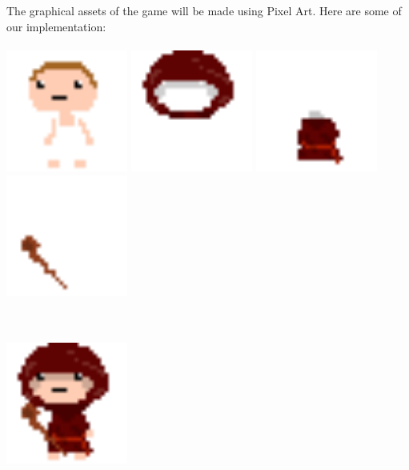 \documentclass[16pt, oneside]{report}
\begin{document}
The graphical assets of the game will be made using Pixel Art. Here are some of our implementation:
\\
\\
\includegraphics[width=0.3\textwidth]{character-base}
\includegraphics[width=0.3\textwidth]{character-head}
\includegraphics[width=0.3\textwidth]{character-robe}
\includegraphics[width=0.3\textwidth]{character-wand}
\\
\\
\\
\begin{center}
\includegraphics[width=0.3\textwidth]{character}
\end{center}
\end{document}
